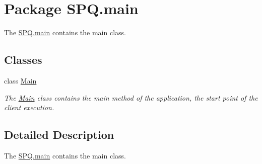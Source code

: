\hypertarget{namespace_s_p_q_1_1main}{}\section{Package S\+P\+Q.\+main}
\label{namespace_s_p_q_1_1main}


The \mbox{\hyperlink{namespace_s_p_q_1_1main}{S\+P\+Q.\+main}} contains the main class.  


\subsection*{Classes}
\begin{DoxyCompactItemize}
\item 
class \mbox{\hyperlink{class_s_p_q_1_1main_1_1_main}{Main}}
\begin{DoxyCompactList}\small\item\em The \mbox{\hyperlink{class_s_p_q_1_1main_1_1_main}{Main}} class contains the main method of the application, the start point of the client execution. \end{DoxyCompactList}\end{DoxyCompactItemize}


\subsection{Detailed Description}
The \mbox{\hyperlink{namespace_s_p_q_1_1main}{S\+P\+Q.\+main}} contains the main class. 